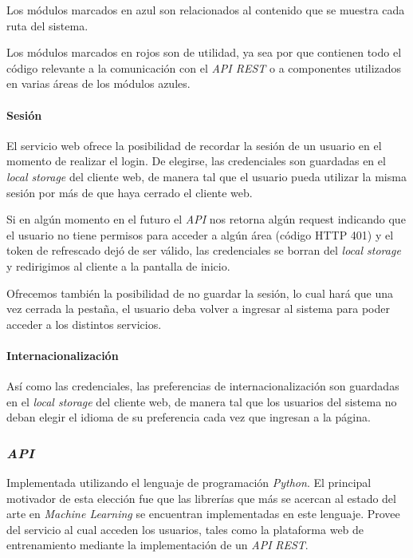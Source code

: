 \documentclass[12pt,a4paper,]{scrartcl}
\let\oldparagraph\paragraph
\renewcommand{\paragraph}[1]{\oldparagraph{#1}\mbox{}}
\begin{document}
Los módulos marcados en azul son relacionados al contenido que se muestra cada ruta del sistema.

Los módulos marcados en rojos son de utilidad, ya sea por que contienen todo el código relevante a la comunicación con el \emph{API REST} o a componentes utilizados en varias áreas de los módulos azules.

\hypertarget{sesiuxf3n}{%
\paragraph{Sesión}\label{sesiuxf3n}}

El servicio web ofrece la posibilidad de recordar la sesión de un usuario en el momento de realizar el login. De elegirse, las credenciales son guardadas en el \emph{local storage} del cliente web, de manera tal que el usuario pueda utilizar la misma sesión por más de que haya cerrado el cliente web.

Si en algún momento en el futuro el \emph{API} nos retorna algún request indicando que el usuario no tiene permisos para acceder a algún área (código HTTP 401) y el token de refrescado dejó de ser válido, las credenciales se borran del \emph{local storage} y redirigimos al cliente a la pantalla de inicio.

Ofrecemos también la posibilidad de no guardar la sesión, lo cual hará que una vez cerrada la pestaña, el usuario deba volver a ingresar al sistema para poder acceder a los distintos servicios.

\hypertarget{internacionalizaciuxf3n}{%
\paragraph{Internacionalización}\label{internacionalizaciuxf3n}}

Así como las credenciales, las preferencias de internacionalización son guardadas en el \emph{local storage} del cliente web, de manera tal que los usuarios del sistema no deban elegir el idioma de su preferencia cada vez que ingresan a la página.

\hypertarget{api-2}{%
\subsubsection{\texorpdfstring{\emph{API}}{API}}\label{api-2}}

Implementada utilizando el lenguaje de programación \emph{Python}. El principal motivador de esta elección fue que las librerías que más se acercan al estado del arte en \emph{Machine Learning} se encuentran implementadas en este lenguaje. Provee del servicio al cual acceden los usuarios, tales como la plataforma web de entrenamiento mediante la implementación de un \emph{API} \emph{REST}.
\end{document}
